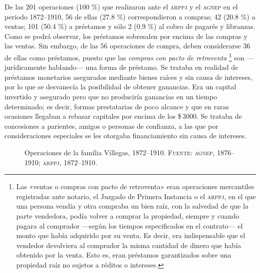 \documentclass[14pt,twoside,final]{extbook} %
\let\oldfootnote\footnote
\renewcommand\footnote[1]{%
\oldfootnote{\hspace{1mm}#1}}
\begin{document}
De las 201 operaciones (100 \%) que realizaron ante el \textsc{arppj} y el \textsc{agnep} en el periodo 1872--1910, 56 de ellas (27.8 \%) correspondieron a compras; 42 (20.8 \%) a ventas; 101 (50.4 \%) a préstamos y sólo 2 (0.9 \%) al cobro de pagarés y libranzas. Como se podrá observar, los préstamos sobresalen por encima de las compras y las ventas. Sin embargo, de las 56 operaciones de compra, deben considerarse 36 de ellas como préstamos, puesto que las \emph{compras con pacto de retroventa}\footnote{Las «ventas o compras con pacto de retroventa» eran operaciones mercantiles registradas ante notario, el Juzgado de Primera Instancia o el \textsc{arppj}, en el que una persona vendía y otra compraba un bien raíz, con la salvedad de que la parte vendedora, podía volver a comprar la propiedad, siempre y cuando pagara al comprador ---según los tiempos especificados en el contrato--- el monto que había adquirido por su venta. Es decir, era indispensable que el vendedor devolviera al comprador la misma cantidad de dinero que había obtenido por la venta. Esto es, eran préstamos garantizados sobre una propiedad raíz no sujetos a réditos o intereses.} son ---jurídicamente hablando--- una forma de préstamo. Se trataba en realidad de préstamos monetarios asegurados mediante bienes raíces y sin causa de intereses, por lo que se desvanecía la posibilidad de obtener ganancias. Era un capital invertido y asegurado pero que no produciría ganancias en un tiempo determinado; es decir, formas prestatarias de poco alcance y que en raras ocasiones llegaban a rebasar capitales por encima de los \$\,3000. Se trataba de concesiones a parientes, amigos o personas de confianza, a las que por consideraciones especiales se les otorgaba financiamiento sin causa de intereses.
\begin{figure}
\centering
{}
\caption[Operaciones de la familia Villegas, 1872--1910]{Operaciones de la familia Villegas, 1872--1910. \textsc{Fuente:} \textsc{agnep}, 1876--1910; \textsc{arppj}, 1872--1910.}
\label{fig:operaciones-villegas}
\end{figure}
\end{document}
